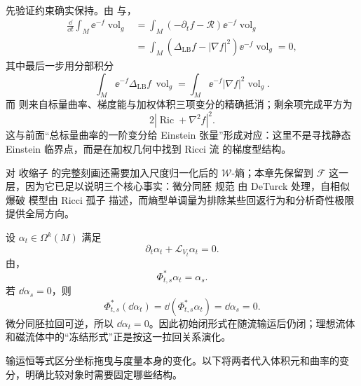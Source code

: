 先验证约束确实保持。由 与，
\begin{align*}
\frac{\dd}{\dd t}\int_M\ee^{-f}\operatorname{vol}_g
&=\int_M(-\partial_tf-\mathcal R)\ee^{-f}\operatorname{vol}_g\\
&=\int_M
(\Delta_{\mathrm{LB}}f-|\nabla f|^2)
\ee^{-f}\operatorname{vol}_g=0,
\end{align*}
其中最后一步用分部积分
\[
\int_M\ee^{-f}\Delta_{\mathrm{LB}}f\,\operatorname{vol}_g
=\int_M\ee^{-f}|\nabla f|^2\operatorname{vol}_g.
\]
而 则来自标量曲率、梯度能与加权体积三项变分的精确抵消；剩余项完成平方为
\[
2|\operatorname{Ric}+\nabla^2f|^2.
\]
这与前面“总标量曲率的一阶变分给 Einstein 张量”形成对应：这里不是寻找静态 Einstein 临界点，而是在加权几何中找到 Ricci 流 的梯度型结构。

对 收缩子 的完整刻画还需要加入尺度归一化后的 $\mathcal W$-熵；本章先保留到 $\mathcal F$ 这一层，因为它已足以说明三个核心事实：微分同胚 规范 由 DeTurck 处理，自相似 爆破 模型由 Ricci 孤子 描述，而熵型单调量为排除某些回返行为和分析奇性极限提供全局方向。

\begin{exbox}[闭形式的冻结输运]
设 $\alpha_t\in\Omega^k(M)$ 满足
\[
\partial_t\alpha_t+\mathcal L_{V_t}\alpha_t=0.
\]
由，
\[
\Phi_{t,s}^*\alpha_t=\alpha_s.
\]
若 $\dd\alpha_s=0$，则
\[
\Phi_{t,s}^*(\dd\alpha_t)
=\dd(\Phi_{t,s}^*\alpha_t)
=\dd\alpha_s=0.
\]
微分同胚拉回可逆，所以 $\dd\alpha_t=0$。因此初始闭形式在随流输运后仍闭；理想流体和磁流体中的“冻结形式”正是按这一拉回关系演化。
\end{exbox}
输运恒等式区分坐标拖曳与度量本身的变化。以下将两者代入体积元和曲率的变分，明确比较对象时需要固定哪些结构。




